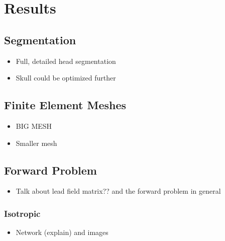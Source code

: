 %

\section{Results}
\label{sec:results}

\subsection{Segmentation}

\begin{itemize}

\item Full, detailed head segmentation

\item Skull could be optimized further

\end{itemize}

\subsection{Finite Element Meshes}

\begin{itemize}

\item BIG MESH

\item Smaller mesh

\end{itemize}

\subsection{Forward Problem}

\begin{itemize}
\item Talk about lead field matrix?? and the forward problem in general
\end{itemize}

\subsubsection{Isotropic}

\begin{itemize}

\item Network (explain) and images

\end{itemize}

